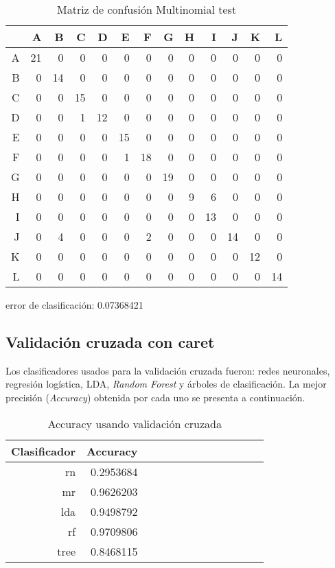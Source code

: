 \begin{table}[ht]
\centering
\begin{tabular}{rrrrrrrrrrrrr}
  \hline
 & A & B & C & D & E & F & G & H & I & J & K & L \\ 
  \hline
A &  21 &   0 &   0 &   0 &   0 &   0 &   0 &   0 &   0 &   0 &   0 &   0 \\ 
  B &   0 &  14 &   0 &   0 &   0 &   0 &   0 &   0 &   0 &   0 &   0 &   0 \\ 
  C &   0 &   0 &  15 &   0 &   0 &   0 &   0 &   0 &   0 &   0 &   0 &   0 \\ 
  D &   0 &   0 &   1 &  12 &   0 &   0 &   0 &   0 &   0 &   0 &   0 &   0 \\ 
  E &   0 &   0 &   0 &   0 &  15 &   0 &   0 &   0 &   0 &   0 &   0 &   0 \\ 
  F &   0 &   0 &   0 &   0 &   1 &  18 &   0 &   0 &   0 &   0 &   0 &   0 \\ 
  G &   0 &   0 &   0 &   0 &   0 &   0 &  19 &   0 &   0 &   0 &   0 &   0 \\ 
  H &   0 &   0 &   0 &   0 &   0 &   0 &   0 &   9 &   6 &   0 &   0 &   0 \\ 
  I &   0 &   0 &   0 &   0 &   0 &   0 &   0 &   0 &  13 &   0 &   0 &   0 \\ 
  J &   0 &   4 &   0 &   0 &   0 &   2 &   0 &   0 &   0 &  14 &   0 &   0 \\ 
  K &   0 &   0 &   0 &   0 &   0 &   0 &   0 &   0 &   0 &   0 &  12 &   0 \\ 
  L &   0 &   0 &   0 &   0 &   0 &   0 &   0 &   0 &   0 &   0 &   0 &  14 \\ 
   \hline
\end{tabular}
	\label{tabla:confusionMLtest}
	\caption{Matriz de confusión Multinomial test}
\end{table}

error de clasificación: 0.07368421

\pagebreak
\subsection{Validación cruzada con caret}

Los clasificadores usados para la validación cruzada fueron: redes neuronales, regresión logística, LDA, \textit{Random Forest} y árboles de clasificación.
La mejor precisión (\textit{Accuracy}) obtenida por cada uno se presenta a continuación.


\begin{table}[ht]
\centering
\begin{tabular}{rrrrrrrrrrrrr}
  \hline
Clasificador & Accuracy\\ 
  \hline
rn &   0.2953684  \\ 
mr &   0.9626203  \\ 
lda &   0.9498792 \\ 
rf &   0.9709806 \\ 
tree &   0.8468115\\ 
   \hline
\end{tabular}
	\label{tabla:AccuracyCV}
	\caption{Accuracy usando validación cruzada}
\end{table}